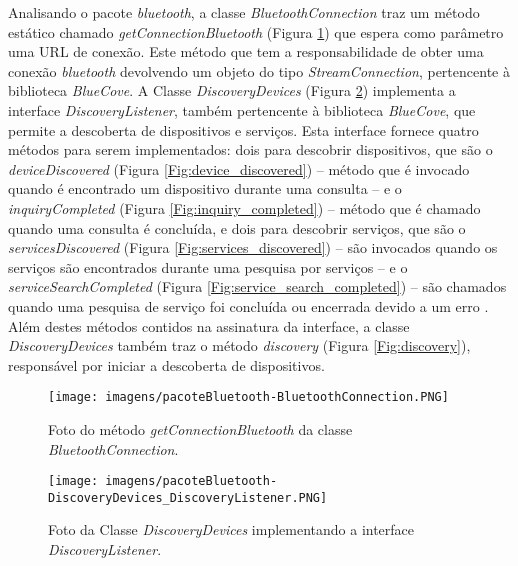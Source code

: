 Analisando o pacote \textit{bluetooth}, a classe \textit{BluetoothConnection} traz um método estático chamado \textit{getConnectionBluetooth} (Figura \ref{Fig:get_connection_bluetooth}) que espera como parâmetro uma URL de conexão. Este método que tem a responsabilidade de obter uma conexão \textit{bluetooth} devolvendo um objeto do tipo \textit{StreamConnection}, pertencente à biblioteca \textit{BlueCove}. A Classe \textit{DiscoveryDevices} (Figura \ref{Fig:discovery_devices}) implementa a interface \textit{DiscoveryListener}, também pertencente à biblioteca \textit{BlueCove}, que permite a descoberta de dispositivos e serviços. Esta interface fornece quatro métodos para serem implementados: dois para descobrir dispositivos, que são o \textit{deviceDiscovered} (Figura \ref{Fig:device_discovered}) – método que é invocado quando é encontrado um dispositivo durante uma consulta – e o \textit{inquiryCompleted} (Figura \ref{Fig:inquiry_completed}) – método que é chamado quando uma consulta é concluída, e dois para descobrir serviços, que são o \textit{servicesDiscovered} (Figura \ref{Fig:services_discovered}) – são invocados quando os serviços são encontrados durante uma pesquisa por serviços – e o \textit{serviceSearchCompleted} (Figura \ref{Fig:service_search_completed}) – são chamados quando uma pesquisa de serviço foi concluída ou encerrada devido a um erro \cite{bluecovedoc}. Além destes métodos contidos na assinatura da interface, a classe \textit{DiscoveryDevices} também traz o método \textit{discovery} (Figura \ref{Fig:discovery}), responsável por iniciar a descoberta de dispositivos.

\begin{figure}[!ht]
\centering
\caption{Foto do método \textit{getConnectionBluetooth} da classe \textit{BluetoothConnection}.} 
{\texttt{[image: imagens/pacoteBluetooth-BluetoothConnection.PNG]}}\\
 \label{Fig:get_connection_bluetooth}
\end{figure}

\begin{figure}[!ht]
\centering
\caption{Foto da Classe \textit{DiscoveryDevices} implementando a interface \textit{DiscoveryListener}.} 
{\texttt{[image: imagens/pacoteBluetooth-DiscoveryDevices\_DiscoveryListener.PNG]}}\\
 \label{Fig:discovery_devices}
\end{figure}

